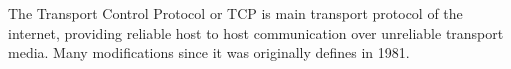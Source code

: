 The Transport Control Protocol or TCP is main transport protocol of the internet, providing reliable host to host communication over unreliable transport media\cite{RFC793}. Many modifications since it was originally defines in 1981.
